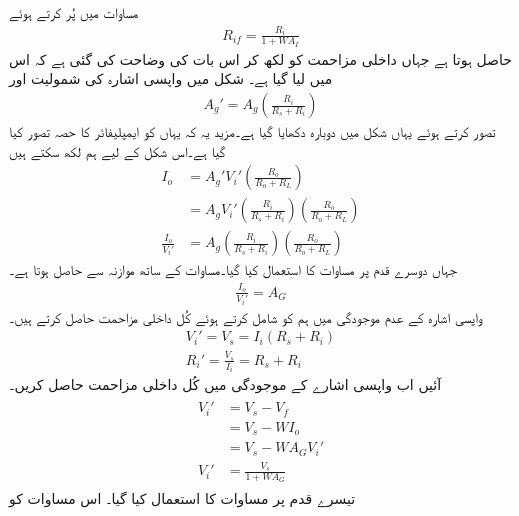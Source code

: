 مساوات  میں  پُر کرتے ہوئے
\begin{align}
R_{if}=\frac{ R_i}{1+W A_I}
\end{align}
حاصل ہوتا ہے جہاں داخلی مزاحمت کو  لکھ کر اس بات کی وضاحت کی گئی ہے کہ اس میں  لیا گیا ہے۔
شکل  میں واپسی اشارہ  کی شمولیت اور
\begin{align} \label{مساوات_واپسی_موصلیت_نما_افزائش_بمع_اشارہ_مزاحمت}
A_g' = A_g \left( \frac{R_i}{R_s+R_i} \right )
\end{align}
تصور کرتے ہوئے یہاں شکل  میں دوبارہ دکھایا گیا ہے۔مزید یہ کہ یہاں  کو ایمپلیفائر کا حصہ تصور کیا گیا ہے۔اس شکل کے لیے ہم لکھ سکتے ہیں
\begin{align*}
I_o&=A_g' V_i' \left (\frac{R_o}{R_o+R_L} \right ) \\
&=A_g V_i' \left (\frac{R_i}{R_s+R_i} \right ) \left (\frac{R_o}{R_o+R_L} \right ) \\
\frac{I_o}{V_i'}&=A_g \left (\frac{R_i}{R_s+R_i} \right ) \left (\frac{R_o}{R_o+R_L} \right )
\end{align*}
جہاں دوسرے قدم پر مساوات   کا استعمال کیا گیا۔مساوات  کے ساتھ موازنہ سے حاصل ہوتا ہے۔
\begin{align} \label{مساوات_واپسی_موصلیت_نما_افزائش_ب}
\frac{I_o}{V_i'}=A_G
\end{align}
واپسی اشارہ  کے عدم موجودگی میں ہم  کو شامل کرتے ہوئے کُل داخلی مزاحمت  حاصل کرتے ہیں۔
\begin{align*}
V_i'=V_s =I_i \left(R_s+R_i \right) \\
R_i'=\frac{V_s}{I_i}=R_s+R_i
\end{align*}
آئیں اب واپسی اشارے کے موجودگی میں کُل داخلی مزاحمت  حاصل کریں۔ 
\begin{gather} \label{مساوات_واپسی_داخلی_دباو_بالمقابل_اشارہ}
\begin{aligned}
V_i' &=V_s-V_f \\
&=V_s-W I_o \\
&=V_s-W A_G V_i'\\
V_i'&=\frac{V_s}{1+W A_G}
\end{aligned}
\end{gather}
تیسرے قدم پر مساوات  کا استعمال کیا گیا۔ اس مساوات کو 
